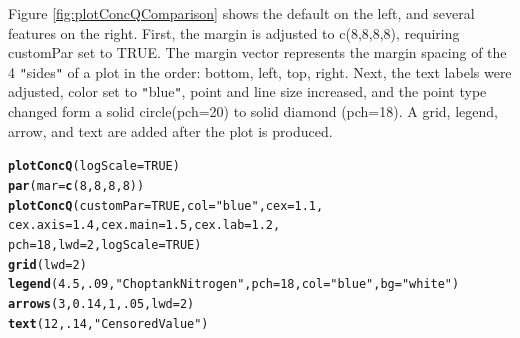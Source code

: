 \documentclass[a4paper,11pt]{article}\usepackage[]{graphicx}\usepackage[]{color}
\makeatletter
\newcommand{\hlnum}[1]{\textcolor[rgb]{0.686,0.059,0.569}{#1}}%
\newcommand{\hlstr}[1]{\textcolor[rgb]{0.192,0.494,0.8}{#1}}%
\newcommand{\hlstd}[1]{\textcolor[rgb]{0.345,0.345,0.345}{#1}}%
\newcommand{\hlkwc}[1]{\textcolor[rgb]{0.333,0.667,0.333}{#1}}%
\newcommand{\hlkwd}[1]{\textcolor[rgb]{0.737,0.353,0.396}{\textbf{#1}}}%
\newenvironment{kframe}{%
 \def\at@end@of@kframe{}%
 \ifinner\ifhmode%
  \def\at@end@of@kframe{\end{minipage}}%
  \begin{minipage}{\columnwidth}%
 \fi\fi%
 \def\FrameCommand##1{\hskip\@totalleftmargin \hskip-\fboxsep
 \colorbox{shadecolor}{##1}\hskip-\fboxsep
     \hskip-\linewidth \hskip-\@totalleftmargin \hskip\columnwidth}%
 \MakeFramed {\advance\hsize-\width
   \@totalleftmargin\z@ \linewidth\hsize
   \@setminipage}}%
 {\par\unskip\endMakeFramed%
 \at@end@of@kframe}
\newenvironment{knitrout}{}{} %
\makeatother
\begin{document}
Figure \ref{fig:plotConcQComparison} shows the default on the left, and several features on the right. First, the margin is adjusted to c(8,8,8,8), requiring customPar set to TRUE. The margin vector represents the margin spacing of the 4 \texttt{"}sides\texttt{"} of a plot in the order: bottom, left, top, right. Next, the text labels were adjusted, color set to \texttt{"}blue\texttt{"}, point and line size increased, and the point type changed form a solid circle(pch=20) to solid diamond (pch=18). A grid, legend, arrow, and text are added after the plot is produced.
\begin{knitrout}
\color{fgcolor}\begin{kframe}
\begin{alltt}
\hlkwd{plotConcQ}\hlstd{(}\hlkwc{logScale}\hlstd{=}\hlnum{TRUE}\hlstd{)}
\hlkwd{par}\hlstd{(}\hlkwc{mar}\hlstd{=}\hlkwd{c}\hlstd{(}\hlnum{8}\hlstd{,}\hlnum{8}\hlstd{,}\hlnum{8}\hlstd{,}\hlnum{8}\hlstd{))}
\hlkwd{plotConcQ}\hlstd{(}\hlkwc{customPar}\hlstd{=}\hlnum{TRUE}\hlstd{,}\hlkwc{col}\hlstd{=}\hlstr{"blue"}\hlstd{,}\hlkwc{cex}\hlstd{=}\hlnum{1.1}\hlstd{,}
          \hlkwc{cex.axis}\hlstd{=}\hlnum{1.4}\hlstd{,}\hlkwc{cex.main}\hlstd{=}\hlnum{1.5}\hlstd{,}\hlkwc{cex.lab}\hlstd{=}\hlnum{1.2}\hlstd{,}
          \hlkwc{pch}\hlstd{=}\hlnum{18}\hlstd{,}\hlkwc{lwd}\hlstd{=}\hlnum{2}\hlstd{,}\hlkwc{logScale}\hlstd{=}\hlnum{TRUE}\hlstd{)}
\hlkwd{grid}\hlstd{(}\hlkwc{lwd}\hlstd{=}\hlnum{2}\hlstd{)}
\hlkwd{legend}\hlstd{(}\hlnum{4.5}\hlstd{,}\hlnum{.09}\hlstd{,}\hlstr{"Choptank Nitrogen"}\hlstd{,} \hlkwc{pch}\hlstd{=}\hlnum{18}\hlstd{,} \hlkwc{col}\hlstd{=}\hlstr{"blue"}\hlstd{,}\hlkwc{bg}\hlstd{=}\hlstr{"white"}\hlstd{)}
\hlkwd{arrows}\hlstd{(}\hlnum{3}\hlstd{,} \hlnum{0.14}\hlstd{,} \hlnum{1}\hlstd{,} \hlnum{.05}\hlstd{,}\hlkwc{lwd}\hlstd{=}\hlnum{2}\hlstd{)}
\hlkwd{text}\hlstd{(}\hlnum{12}\hlstd{,}\hlnum{.14}\hlstd{,}\hlstr{"Censored Value"}\hlstd{)}
\end{alltt}
\end{kframe}\begin{figure}[]

\end{figure}
\end{knitrout}
\end{document}
